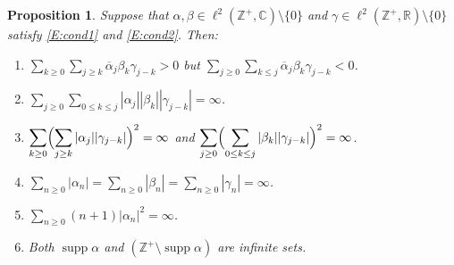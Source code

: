 \documentclass[11pt,reqno]{amsart}
\theoremstyle{plain}
\newtheorem{proposition}[theorem]{Proposition}
\theoremstyle{definition}
\theoremstyle{remark}
\newcommand{\CC}{\mathbb{C}}
\newcommand{\RR}{\mathbb{R}}
\newcommand{\ZZ}{\mathbb{Z}}
\DeclareMathOperator{\supp}{supp}
\begin{document}
\begin{proposition}\label{P:delicate}
Suppose that $\alpha,\beta\in\ell^2(\ZZ^+,\CC)\setminus\{0\}$
and $\gamma\in\ell^2(\ZZ^+,\RR)\setminus\{0\}$
satisfy \eqref{E:cond1} and \eqref{E:cond2}.
Then:
\begin{enumerate}[\normalfont(i)]
\item $\displaystyle\sum_{k\ge0}\sum_{j\ge k}\overline{\alpha}_j\beta_k\gamma_{j-k}>0$
but $\displaystyle\sum_{j\ge0}\sum_{k\le j}\overline{\alpha}_j\beta_k\gamma_{j-k}<0$.
\item $\displaystyle\sum_{j\ge0}\sum_{0\le k\le j}|\alpha_j||\beta_k||\gamma_{j-k}|=\infty$.
\item $\displaystyle\sum_{k\ge0}\Bigl(\sum_{j\ge k}|\alpha_{j}||\gamma_{j-k}|\Bigr)^2=\infty$ 
and $\displaystyle\sum_{j\ge0}\Bigl(\sum_{0\le k\le j}|\beta_{k}||\gamma_{j-k}|\Bigr)^2=\infty$.
\item $\displaystyle\sum_{n\ge0}|\alpha_n|=\sum_{n\ge0}|\beta_n|=\sum_{n\ge0}|\gamma_n|=\infty$.
\item $\displaystyle\sum_{n\ge0}(n+1)|\alpha_n|^2=\infty$.
\item Both $\supp\alpha$ and $\displaystyle (\ZZ^+\setminus \supp\alpha)$ are infinite sets.
\end{enumerate}
\end{proposition}
\end{document}

